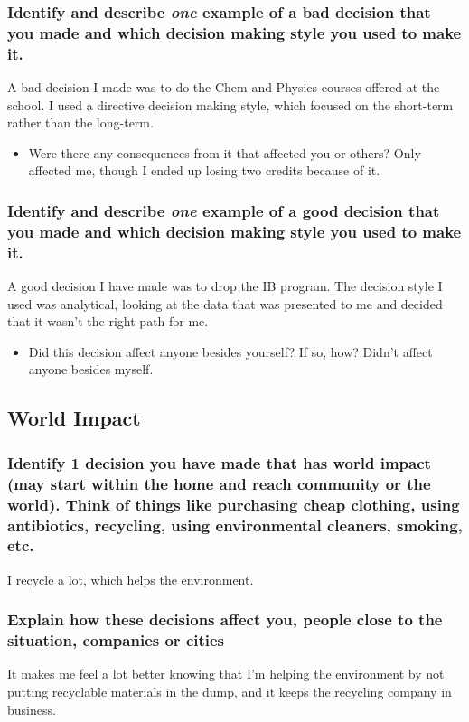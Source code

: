 \documentclass[11pt]{article}
\begin{document}
\subsubsection*{Identify and describe \emph{one} example of a bad decision that you made and which decision making style you used to make it.}
\label{sec:orge06426f}
A bad decision I made was to do the Chem and Physics courses offered at the school. I used a directive decision making style, which focused on the short-term rather than the long-term. 
\begin{itemize}
\item Were there any consequences from it that affected you or others?
\label{sec:org9c29b78}
Only affected me, though I ended up losing two credits because of it.
\end{itemize}
\subsubsection*{Identify and describe \emph{one} example of a good decision that you made and which decision making style you used to make it.}
\label{sec:orga838988}
A good decision I have made was to drop the IB program. The decision style I used was analytical, looking at the data that was presented to me and decided that it wasn't the right path for me. 
\begin{itemize}
\item Did this decision affect anyone besides yourself? If so, how?
\label{sec:org324efa7}
Didn't affect anyone besides myself.
\end{itemize}
\subsection*{World Impact}
\label{sec:org728e1df}
\subsubsection*{Identify 1 decision you have made that has world impact (may start within the home and reach community or the world). Think of things like purchasing cheap clothing, using antibiotics, recycling, using environmental cleaners, smoking, etc.}
\label{sec:org37387c5}
I recycle a lot, which helps the environment.
\subsubsection*{Explain how these decisions affect you, people close to the situation, companies or cities}
\label{sec:org7381660}
It makes me feel a lot better knowing that I'm helping the environment by not putting recyclable materials in the dump, and it keeps the recycling company in business.
\end{document}
